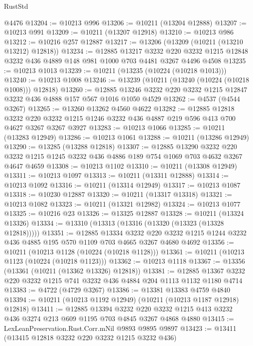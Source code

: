 \begin{lexlean}{RustStd}
\begin{coremodule}
{\begin{coremodule}
{{{{{{{{{{{{{{{{{{{{{{{{{    @4476
@13204 := @10213 @996
@13206 := @10211 (@13204 @12888)
@13207 := @10213 @991
@13209 := @10211 (@13207 @12918)
@13210 := @10213 @986
@13212 := @10216 @257 @12887
@13217 := @13206 (@13209 (@10211 (@13210 @13212) @12818))
@13234 := @12885
    @13217
    @3232
    @220
    @3232
    @1215
    @12848
    @3232
    @436
    @4889
    @148
    @981
    @1000
    @703
    @4481
    @3267
    @4496
    @4508
@13235 := @10213 @1013
@13239 := @10211 (@13235 (@10224 (@10218 @1013)))
@13240 := @10213 @1008
@13246 := @13239 (@10211 (@13240 (@10224 (@10218 @1008))) @12818)
@13260 := @12885 @13246 @3232 @220 @3232 @1215 @12847 @3232 @436 @4888 @157 @567 @1016 @1050 @4529
@13262 := @4537 (@4544 @3267)
@13265 := @13260 @13262 @4560 @4622
@13282 := @12885
    @12818
    @3232
    @220
    @3232
    @1215
    @1246
    @3232
    @436
    @4887
    @219
    @596
    @413
    @700
    @4627
    @3267
    @3267
    @3927
@13283 := @10213 @1066
@13285 := @10211 (@13283 @12949)
@13286 := @10213 @1061
@13288 := @10211 (@13286 @12949)
@13290 := @13285 (@13288 @12818)
@13307 := @12885
    @13290
    @3232
    @220
    @3232
    @1215
    @1245
    @3232
    @436
    @4886
    @189
    @754
    @1069
    @703
    @4632
    @3267
    @4647
    @4659
@13308 := @10213 @1102
@13310 := @10211 (@13308 @12949)
@13311 := @10213 @1097
@13313 := @10211 (@13311 @12888)
@13314 := @10213 @1092
@13316 := @10211 (@13314 @12949)
@13317 := @10213 @1087
@13318 := @10230 @12887
@13320 := @10211 (@13317 @13318)
@13321 := @10213 @1082
@13323 := @10211 (@13321 @12982)
@13324 := @10213 @1077
@13325 := @10216 @23
@13326 := @13325 @12887
@13328 := @10211 (@13324 @13326)
@13334 := @13310 (@13313 (@13316 (@13320 (@13323 (@13328 @12818)))))
@13351 := @12885
    @13334
    @3232
    @220
    @3232
    @1215
    @1244
    @3232
    @436
    @4885
    @195
    @570
    @1109
    @703
    @4665
    @3267
    @4680
    @4692
@13356 := @10211 (@10213 @1128 (@10224 (@10218 @1128)))
@13361 := @10211 (@10213 @1123 (@10224 (@10218 @1123)))
@13362 := @10213 @1118
@13367 := @13356 (@13361 (@10211 (@13362 @13326) @12818))
@13381 := @12885 @13367 @3232 @220 @3232 @1215 @741 @3232 @436 @4884 @204 @1113 @1132 @1180 @4714
@13383 := @4722 (@4729 @3267)
@13386 := @13381 @13383 @4759 @4840
@13394 := @10211 (@10213 @1192 @12949) (@10211 (@10213 @1187 @12918) @12818)
@13411 := @12885
    @13394
    @3232
    @220
    @3232
    @1215
    @413
    @3232
    @436
    @3274
    @213
    @609
    @1195
    @703
    @4845
    @3267
    @4868
    @4880
@13415 := LexLeanPreservation.Rust.Corr.mNil @9893 @9895 @9897
@13423 := @13411 (@13415 @12818 @3232 @220 @3232 @1215 @3232 @436)
}}}}}}}}}}}}}}}}}}}}}}}}}
\end{coremodule}}
\end{coremodule}
\end{lexlean}
